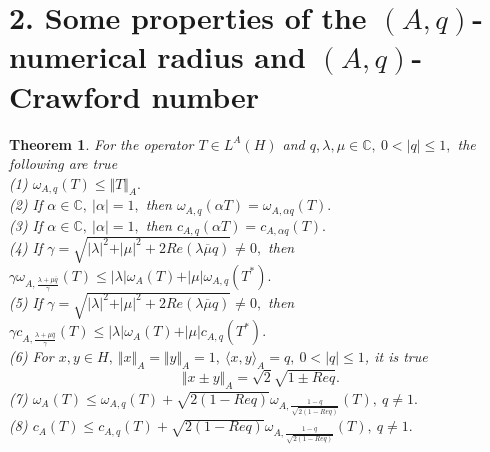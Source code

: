 \documentclass[preprint,12pt,3p]{elsarticle}
\newtheorem{theorem}{Theorem}
\begin{document}
\section*{\normalsize{2. Some properties of the $ (A,q)$-numerical radius and $(A,q)$-Crawford number}}
\begin{theorem}
\label{thm1}
For the operator $ T\in L^{A}(H) $ and $ q,\lambda,\mu\in \mathbb{C}, \ 0<\vert q \vert\leq 1, $ the following are true  \\
(1) $ \omega_{A,q}(T)\leq \Vert T \Vert_{A}. $ \\
(2) If  $ \alpha \in \mathbb{C}, \ \vert \alpha \vert =1, $ then $ \omega_{A,q}(\alpha T)=\omega_{A,\alpha q}(T). $ \\
(3) If  $ \alpha \in \mathbb{C}, \ \vert \alpha \vert =1,$ then $ c_{A,q}(\alpha T)=c_{A,\alpha q}(T). $ \\
(4) If $  \gamma =\sqrt{\vert \lambda\vert^{2}+ \vert \mu\vert^{2}+ 2Re (\lambda \overline{\mu} q)}\neq 0, $ then $ \gamma \omega_{A,\frac{\lambda + \mu \overline{q}}{\gamma}} (T)\leq \vert \lambda\vert\omega_{A}(T)+\vert \mu\vert\omega_{A,q}(T^{*}). $  \\
(5) If $  \gamma =\sqrt{\vert \lambda\vert^{2}+ \vert \mu\vert^{2}+ 2Re (\lambda \overline{\mu} q)}\neq 0, $ then $ \gamma c_{A,\frac{\lambda + \mu \overline{q}}{\gamma} }(T)\leq \vert \lambda\vert\omega_{A}(T)+\vert \mu\vert c_{A,q}(T^{*}). $\\
(6) For $ x,y \in H, \ \Vert x \Vert_{A}=\Vert y \Vert_{A}=1, \ \langle x,y \rangle_{A}=q, \ 0<\vert q \vert \leq 1 $, it is true $$
\Vert x\pm y \Vert_{A}=\sqrt{2}\sqrt{1\pm Req}.
$$ 
(7) $ \omega_{A}(T)\leq \omega_{A, q}(T)+ \sqrt{2(1-Req)}\omega_{A,\frac{1-q}{\sqrt{2(1-Req)}}}(T), \ q\neq 1. $ \\
(8) $ c_{A}(T)\leq c_{A, q}(T)+ \sqrt{2(1-Req)}\omega_{A,\frac{1-q}{\sqrt{2(1-Req)}}}(T), \ q\neq 1 . $
\end{theorem}
\end{document}
